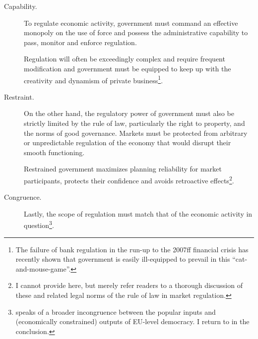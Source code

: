 \begin{description}
	\item[Capability.] \label{it:capability} To regulate economic activity, government must command an effective monopoly on the use of force and possess the administrative capability to pass, monitor and enforce regulation. 

	Regulation will often be exceedingly complex and require frequent modification and government must be equipped to keep up with the creativity and dynamism of private business\footnote{
		The failure of bank regulation in the run-up to the 2007ff financial crisis has recently shown that government is easily ill-equipped to prevail in this ``cat-and-mouse-game''.}. 

	\item[Restraint.] \label{it:restraint} On the other hand, the regulatory power of government must also be strictly limited by the rule of law, particularly the right to property, and the norms of good governance. Markets must be protected from arbitrary or unpredictable regulation of the economy that would disrupt their smooth functioning. 
	
	Restrained government maximizes planning reliability for market participants, protects their confidence and avoids retroactive effects\footnote{
		I cannot provide here, but merely refer readers to a thorough discussion of these and related legal norms of the rule of law in market regulation.}. %

	\item[Congruence.] \label{it:congruence} Lastly, the scope of regulation must match that of the economic activity in question\footnote{
		\cite{Zurn-2000-aa} speaks of a broader incongruence between the popular inputs and (economically constrained) outputs of EU-level democracy. I return to in the conclusion.}.
	

\end{description}
